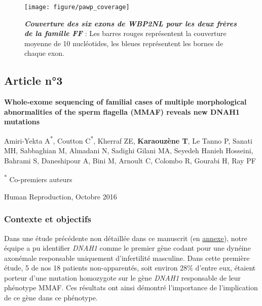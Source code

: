 \documentclass[12pt,a4paper,twoside]{ugathesis}
\theoremstyle{definition}
\theoremstyle{definition}
\theoremstyle{definition}
\theoremstyle{remark}
\begin{document}
\begin{figure}

{\centering \texttt{[image: figure/pawp\_coverage]} 

}

\caption[Couverture des six exons de \emph{WBP2NL} pour
les deux frères de la famille FF\\]{\textbf{\emph{Couverture des six exons de
\emph{WBP2NL} pour les deux frères de la famille FF}} : Les barres
rouges représentent la couverture moyenne de 10 nucléotides, les bleues
représentent les bornes de chaque exon.}\label{fig:plotcovplcz}
\end{figure}








\newpage

\subsection{Article n°3}\label{article-n3}

\textbf{Whole-exome sequencing of familial cases of multiple
morphological abnormalities of the sperm flagella (MMAF) reveals new
DNAH1 mutations}

Amiri-Yekta A\textsuperscript{*}, Coutton C\textsuperscript{*}, Kherraf
ZE, \textbf{Karaouzène T}, Le Tanno P, Sanati MH, Sabbaghian M, Almadani
N, Sadighi Gilani MA, Seyedeh Hanieh Hosseini, Bahrami S, Daneshipour A,
Bini M, Arnoult C, Colombo R, Gourabi H, Ray PF

\textsuperscript{*} Co-premiers auteurs

Human Reproduction, Octobre 2016

\newpage

\subsubsection{Contexte et objectifs}\label{contexte-et-objectifs-2}

Dans une étude précédente non détaillée dans ce manuscrit (en
\protect\hyperlink{dnah12014}{annexe}), notre équipe a pu identifier
\emph{DNAH1} comme le premier gène codant pour une dynéine axonémale
responsable uniquement d'infertilité masculine. Dans cette première
étude, 5 de nos 18 patients non-apparentés, soit environ 28\% d'entre
eux, étaient porteur d'une mutation homozygote sur le gène \emph{DNAH1}
responsable de leur phénotype MMAF. Ces résultats ont ainsi démontré
l'importance de l'implication de ce gène dans ce phénotype.
\end{document}
